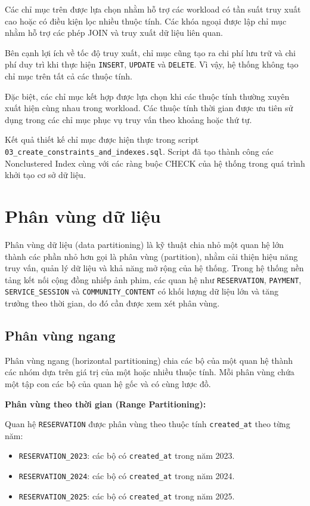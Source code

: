 Các chỉ mục trên được lựa chọn nhằm hỗ trợ các workload có tần suất truy
xuất cao hoặc có điều kiện lọc nhiều thuộc tính. Các khóa ngoại được lập
chỉ mục nhằm hỗ trợ các phép JOIN và truy xuất dữ liệu liên quan.

Bên cạnh lợi ích về tốc độ truy xuất, chỉ mục cũng tạo ra chi phí lưu trữ
và chi phí duy trì khi thực hiện \texttt{INSERT}, \texttt{UPDATE} và
\texttt{DELETE}. Vì vậy, hệ thống không tạo chỉ mục trên tất cả các thuộc
tính.

Đặc biệt, các chỉ mục kết hợp được lựa chọn khi các thuộc tính thường xuyên
xuất hiện cùng nhau trong workload. Các thuộc tính thời gian được ưu tiên
sử dụng trong các chỉ mục phục vụ truy vấn theo khoảng hoặc thứ tự.

Kết quả thiết kế chỉ mục được hiện thực trong script
\texttt{03\_create\_constraints\_and\_indexes.sql}. Script đã tạo thành công
các Nonclustered Index cùng với các ràng buộc CHECK của hệ thống trong quá
trình khởi tạo cơ sở dữ liệu.




\section{Phân vùng dữ liệu}

Phân vùng dữ liệu (data partitioning) là kỹ thuật chia nhỏ một quan hệ lớn thành các phần nhỏ hơn gọi là phân vùng (partition), nhằm cải thiện hiệu năng truy vấn, quản lý dữ liệu và khả năng mở rộng của hệ thống. Trong hệ thống nền tảng kết nối cộng đồng nhiếp ảnh phim, các quan hệ như \texttt{RESERVATION}, \texttt{PAYMENT}, \texttt{SERVICE\_SESSION} và \texttt{COMMUNITY\_CONTENT} có khối lượng dữ liệu lớn và tăng trưởng theo thời gian, do đó cần được xem xét phân vùng.

\subsection{Phân vùng ngang}

Phân vùng ngang (horizontal partitioning) chia các bộ của một quan hệ thành các nhóm dựa trên giá trị của một hoặc nhiều thuộc tính. Mỗi phân vùng chứa một tập con các bộ của quan hệ gốc và có cùng lược đồ.

\textbf{Phân vùng theo thời gian (Range Partitioning):}

Quan hệ \texttt{RESERVATION} được phân vùng theo thuộc tính \texttt{created\_at} theo từng năm:

\begin{itemize}
    \item \texttt{RESERVATION\_2023}: các bộ có \texttt{created\_at} trong năm 2023.
    \item \texttt{RESERVATION\_2024}: các bộ có \texttt{created\_at} trong năm 2024.
    \item \texttt{RESERVATION\_2025}: các bộ có \texttt{created\_at} trong năm 2025.
\end{itemize}

